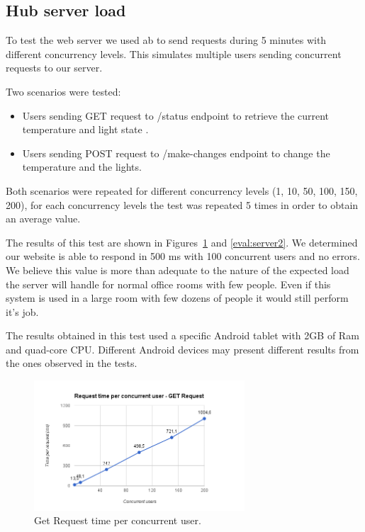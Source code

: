 \subsection{Hub server load}

To test the web server we used \ac{ab} to send requests during 5 minutes with different concurrency levels. This simulates multiple users sending concurrent requests to our server.

Two scenarios were tested:
\begin{itemize}
  \item Users sending GET request to /status endpoint to retrieve the current temperature and light state .
  \item Users sending POST request to /make-changes endpoint to change the temperature and the lights.
\end{itemize} 

Both scenarios were repeated for different concurrency levels (1, 10, 50, 100, 150, 200), for each concurrency levels the test was repeated 5 times in order to obtain an average value. 

The results of this test are shown in Figures~\ref{eval:server1} and \ref{eval:server2}. We determined our website is able to respond in 500 ms with 100 concurrent users and no errors. We believe this value is more than adequate to the nature of the expected load the server will handle for normal office rooms with few people. Even if this system is used in a large room with few dozens of people it would still perform it's job.


The results obtained in this test used a specific Android tablet with 2GB of Ram and quad-core CPU. Different Android devices may present different results from the ones observed in the tests. 

\begin{figure}[H]
\centering
\includegraphics[width=0.7\textwidth]{Figures/bench_get}
\caption{Get Request time per concurrent user.}
\label{eval:server1}
\end{figure}

